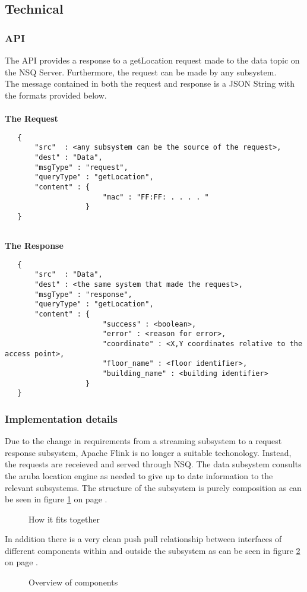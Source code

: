 \subsection{Technical}
\subsubsection{API}
The API provides a response to a getLocation request made to the data topic on the NSQ Server. Furthermore, the request can be made by any subsystem. \\
The message contained in both the request and response is a JSON String with the formats provided below. \\ \\
\textbf{The Request}
\begin{verbatim}
   {
       "src"  : <any subsystem can be the source of the request>, 
       "dest" : "Data", 
       "msgType" : "request", 
       "queryType" : "getLocation", 
       "content" : {
                       "mac" : "FF:FF: . . . . "
                   }
   }     
		         	
\end{verbatim}
\textbf{The Response}
\begin{verbatim}	
   {
       "src"  : "Data", 
       "dest" : <the same system that made the request>, 
       "msgType" : "response", 
       "queryType" : "getLocation", 
       "content" : {
                       "success" : <boolean>,
                       "error" : <reason for error>, 
                       "coordinate" : <X,Y coordinates relative to the access point>,
                       "floor_name" : <floor identifier>,
                       "building_name" : <building identifier>
                   }
   }     		         	
\end{verbatim}
\subsubsection{Implementation details}
Due to the change in requirements from a streaming subsystem to a request response subsystem, Apache Flink is no longer a suitable techonology.
Instead, the requests are receieved and served through NSQ.
The data subsystem consults the aruba location engine as needed to give up to date information to the relevant subsystems. The structure of the subsystem is purely composition as can be seen in figure \ref{fig:data_class_diagram} on page \pageref{fig:data_class_diagram}.
\begin{figure}
    \caption{How it fits together}
    \label{fig:data_class_diagram}
\end{figure}
In addition there is a very clean push pull relationship between interfaces of different components within and outside the subsystem as can be seen in figure \ref{fig:data_component_diagram} on page \pageref{fig:data_component_diagram}.
\begin{figure}
    \caption{Overview of components}
    \label{fig:data_component_diagram}
\end{figure}

